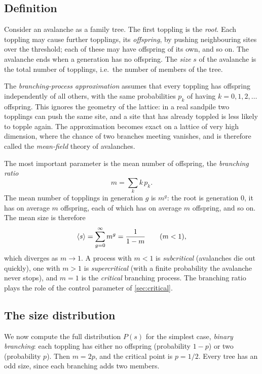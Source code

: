 \subsection{Definition}

Consider an avalanche as a family tree. The first toppling is the \emph{root}. Each toppling may cause further topplings, its
\emph{offspring}, by pushing neighbouring sites over the threshold; each of these may have offspring of its own, and so on. The avalanche ends
when a generation has no offspring. The \emph{size} $s$ of the avalanche is the total number of topplings, i.e.\ the number of members of the
tree.

The \emph{branching-process approximation} assumes that every toppling has offspring independently of all others, with the same probabilities
$p_k$ of having $k = 0,1,2,\dots$ offspring. This ignores the geometry of the lattice: in a real sandpile two topplings can push the same site,
and a site that has already toppled is less likely to topple again. The approximation becomes exact on a lattice of very high dimension, where
the chance of two branches meeting vanishes, and is therefore called the \emph{mean-field} theory of avalanches.

The most important parameter is the mean number of offspring, the \emph{branching ratio}
\begin{equation}
  m = \sum_k k\,p_k .
\end{equation}
The mean number of topplings in generation $g$ is $m^g$: the root is generation 0, it has on average $m$ offspring, each of which has on average
$m$ offspring, and so on. The mean size is therefore
\begin{equation}
  \left\langle s \right\rangle = \sum_{g=0}^\infty m^g = \frac{1}{1-m}\qquad(m<1),
  \label{eq:bp-mean}
\end{equation}
which diverges as $m\to1$. A process with $m<1$ is \emph{subcritical} (avalanches die out quickly), one with $m>1$ is \emph{supercritical}
(with a finite probability the avalanche never stops), and $m = 1$ is the \emph{critical} branching process. The branching ratio plays the
role of the control parameter of \cref{sec:critical}.

\subsection{The size distribution}

We now compute the full distribution $P(s)$ for the simplest case, \emph{binary branching}: each toppling has either no offspring (probability
$1-p$) or two (probability $p$). Then $m = 2p$, and the critical point is $p=1/2$. Every tree has an odd size, since each branching adds two members.


